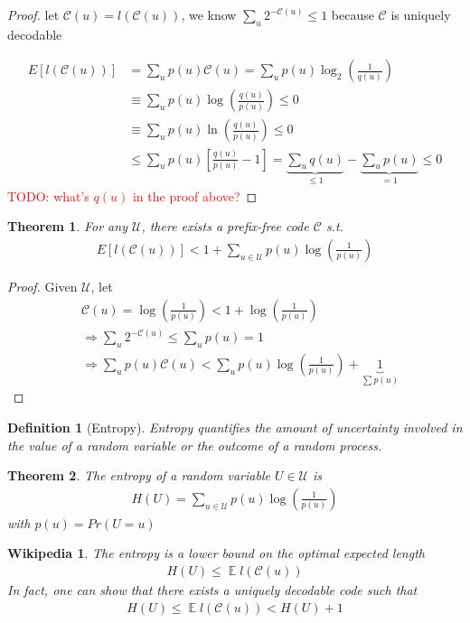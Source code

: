 \documentclass{article}
\newtheorem{theorem}{Theorem}[section]
\newtheorem*{wikipedia}{Wikipedia}
\newtheorem{definition}{Definition}[section]
\theoremstyle{definition} %
\newcommand{\todo}[1]{\textcolor{red}{TODO: #1}}
\def\U{\mathcal{U}}
\def\C{\mathscr{C}}
\DeclareMathOperator{\E}{\mathbb{E}}%
\begin{document}
\begin{proof}
  let $\C(u) = l(\C(u))$, we know $\sum_u 2^{-\C(u)} \leq 1$ because $\C$ is uniquely decodable

  \begin{align*}
    E[l(\C(u))] &= \sum_u p(u) \C(u) = \sum_u p(u) \log_2(\frac{1}{q(u)}) \\
    &\equiv \sum_u p(u) \log(\frac{q(u)}{p(u)}) \leq 0 \\
    &\equiv \sum_u p(u) \ln(\frac{q(u)}{p(u)}) \leq 0 \\
    &\leq \sum_u p(u) [\frac{q(u)}{p(u)} - 1]
    = \underbrace{\sum_u q(u)}_{\leq 1} - \underbrace{\sum_u p(u)}_{=1} \leq 0
  \end{align*}
  \todo{what's $q(u)$ in the proof above?}
\end{proof}

\begin{theorem}
  For any $\U$, there exists a prefix-free code $\C$ s.t.
  \begin{align*}
    E[l(\C(u))] < 1 + \sum_{u \in \U} p(u) \log(\frac{1}{p(u)})
  \end{align*}
\end{theorem}
\begin{proof}
  Given $\U$, let
  \begin{align*}
    &\C(u) = \log(\frac{1}{p(u)}) < 1 + \log(\frac{1}{p(u)}) \\
    &\Rightarrow \sum_u 2^{-\C(u)} \leq \sum_u p(u) = 1 \\
    &\Rightarrow \sum_u p(u) \C(u) < \sum_u p(u) \log(\frac{1}{p(u)}) + \underbrace{1}_{\sum p(u)}
  \end{align*}
\end{proof}

\begin{definition}[Entropy]
  Entropy quantifies the amount of uncertainty involved in the value of a random variable or the outcome of a random process.
\end{definition}

\begin{theorem}
  The entropy of a random variable $U \in \U$ is
  \begin{align*}
    H(U) = \sum_{u \in \U} p(u) \log(\frac{1}{p(u)})
  \end{align*}
  with $p(u) = Pr(U = u)$
\end{theorem}

\begin{wikipedia}
  The entropy is a lower bound on the optimal expected length
  \begin{align*}
    H(U) \leq \E{l(\C(u))} 
  \end{align*}
  In fact, one can show that there exists a uniquely decodable code such that 
  \begin{align*}
     H(U) \leq \E{l(\C(u))} < H(U) + 1
   \end{align*} 
\end{wikipedia}
\end{document}
